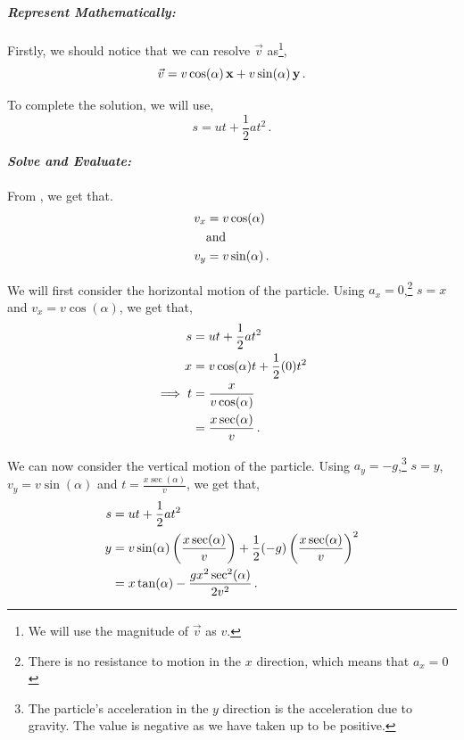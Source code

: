 \begin{subquestions}
\textbf{\textit{Represent Mathematically:}} \\ \\
Firstly, we should notice that we can resolve $\vec{v}$ as\footnote{We will use the magnitude of $\vec{v}$ as $v$.},
\begin{equation}
	\vec{v} = v\cos(\alpha)\,\mathbf{x} + v\sin(\alpha)\,\mathbf{y} \,. \label{2013:q6:Eqn1}
\end{equation}

To complete the solution, we will use,
\begin{equation}
	s = ut + \frac{1}{2}at^2 \,.
\end{equation}




\textbf{\textit{Solve and Evaluate:}} \\ \\
From , we get that.
\begin{align}
	v_x & = v\cos(\alpha) \\
	& \text{and} \nonumber \\
	v_y & = v\sin(\alpha) \,.
\end{align} 

We will first consider the horizontal motion of the particle. Using $a_x=0$,\footnote{There is no resistance to motion in the $x$ direction, which means that $a_x=0$} $s=x$ and $v_x=v\cos(\alpha)$, we get that,
\begin{align}
	s & = ut + \frac{1}{2}at^2 \nonumber \\
	x & = v\cos(\alpha)t + \frac{1}{2}(0)t^2 \nonumber \\
	\implies t & = \frac{x}{v\cos(\alpha)} \nonumber \\
	& = \frac{x\sec(\alpha)}{v} \,.
\end{align}	

We can now consider the vertical motion of the particle. Using $a_y=-g$,\footnote{The particle's acceleration in the $y$ direction is the acceleration due to gravity. The value is negative as we have taken up to be positive.} $s=y$, $v_y=v\sin(\alpha)$ and $t=\frac{x\sec(\alpha)}{v}$, we get that,
\begin{align}
	s & = ut + \frac{1}{2}at^2 \nonumber \\
	y & = v\sin(\alpha)\left(\frac{x\sec(\alpha)}{v}\right) + \frac{1}{2}(-g)\left(\frac{x\sec(\alpha)}{v}\right)^2 \nonumber \\
	& = x\tan(\alpha) - \frac{gx^2\sec^2(\alpha)}{2v^2} \,.
\end{align}



\end{subquestions}
